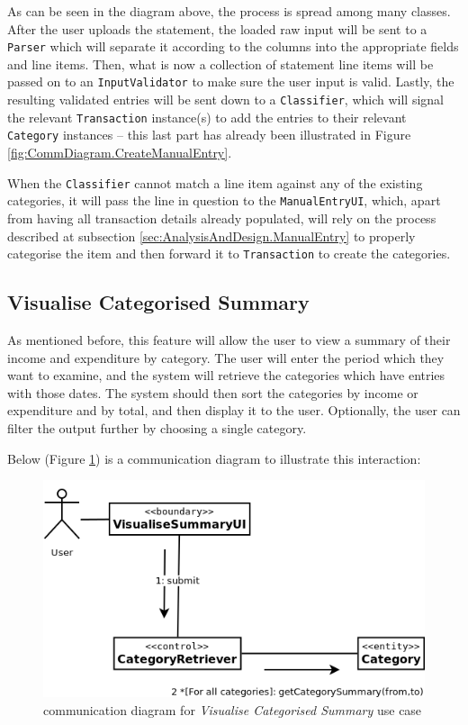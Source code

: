 As can be seen in the diagram above, the process is spread among many classes.
After the user uploads the statement, the loaded raw input will be sent to a
\texttt{Parser} which will separate it according to the columns into the
appropriate fields and line items. Then, what is now a collection of statement
line items will be passed on to an \texttt{InputValidator} to make sure the user
input is valid. Lastly, the resulting validated entries will be sent down to a
\texttt{Classifier}, which will signal the relevant \texttt{Transaction}
instance(s) to add the entries to their relevant \texttt{Category} instances --
this last part has already been illustrated in Figure
\ref{fig:CommDiagram.CreateManualEntry}. 

When the \texttt{Classifier} cannot match a line item against any of the existing
categories, it will pass the line in question to the \texttt{ManualEntryUI},
which, apart from having all transaction details already populated, will rely
on the process described at subsection \ref{sec:AnalysisAndDesign.ManualEntry}
to properly categorise the item and then forward it to \texttt{Transaction} to
create the categories.

\subsection{Visualise Categorised Summary} \label{sec:AnalysisAndDesign.ViewSummary}
As mentioned before, this feature will allow the user to view a summary of
their income and expenditure by category.  The user will enter the period which
they want to examine, and the system will retrieve the categories which have
entries with those dates.  The system should then sort the categories by income
or expenditure and by total, and then display it to the user. Optionally, the
user can filter the output further by choosing a single category.

Below (Figure \ref{fig:CommDiagram.VisualiseCategorisedSummary}) is a
communication diagram to illustrate this interaction: 
\begin{figure}[ht!]
  \begin{center}
    \includegraphics[width=12cm]{./contents/img/Comm_Diagram_-_Visualise_Categorised_Summary.png}
  \end{center}
  \caption{communication diagram for \emph{Visualise Categorised Summary} use case}
  \label{fig:CommDiagram.VisualiseCategorisedSummary}
\end{figure}
\FloatBarrier



